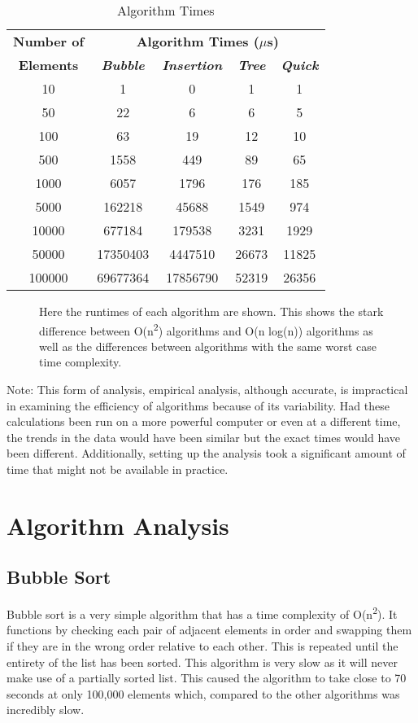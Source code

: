 \documentclass[conference]{IEEEtran}
\begin{document}
\begin{table}[htbp]
\caption{Algorithm Times}
\begin{center}
\begin{tabular}{|c|c|c|c|c|}
\hline
\textbf{Number of}&\multicolumn{4}{|c|}{\textbf{Algorithm Times ($\mu$s)}} \\
\cline{2-5} 
\textbf{Elements} & \textbf{\textit{Bubble}}& \textbf{\textit{Insertion}}& \textbf{\textit{Tree}}& \textbf{\textit{Quick}} \\
\hline
10& 1& 0& 1& 1\\
\hline
50& 22& 6& 6& 5\\
\hline
100& 63& 19& 12& 10\\
\hline
500& 1558& 449& 89& 65\\
\hline
1000& 6057& 1796& 176& 185\\
\hline
5000& 162218& 45688& 1549& 974\\
\hline
10000& 677184& 179538& 3231& 1929\\
\hline
50000& 17350403& 4447510& 26673& 11825\\
\hline
100000& 69677364& 17856790& 52319& 26356\\
\hline
\end{tabular}
\label{tab1}
\end{center}
\end{table}
\begin{figure}[htbp]
\caption{Here the runtimes of each algorithm are shown. This shows the stark difference between O(n\textsuperscript{2}) algorithms and O(n log(n)) algorithms as well as the differences between algorithms with the same worst case time complexity.}
\label{fig}
\end{figure}

Note: This form of analysis, empirical analysis, although accurate, is impractical in examining the efficiency of algorithms because of its variability. Had these calculations been run on a more powerful computer or even at a different time, the trends in the data would have been similar but the exact times would have been different. Additionally, setting up the analysis took a significant amount of time that might not be available in practice.

\section{Algorithm Analysis}

\subsection{Bubble Sort}\label{AA}
Bubble sort is a very simple algorithm that has a time complexity of O(n\textsuperscript{2}). It functions by checking each pair of adjacent elements in order and swapping them if they are in the wrong order relative to each other. This is repeated until the entirety of the list has been sorted. This algorithm is very slow as it will never make use of a partially sorted list. This caused the algorithm to take close to 70 seconds at only 100,000 elements which, compared to the other algorithms was incredibly slow.
\end{document}
